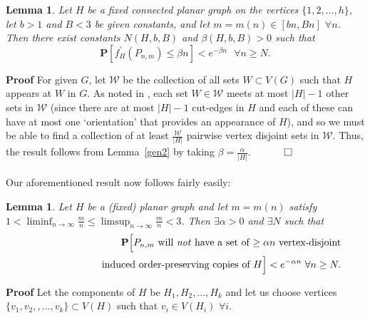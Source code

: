 \documentclass{article}
\newtheorem{Lemma}[Theorem]{Lemma}
\newtheorem{Proof of Theorem}{Proof of Theorem}
\begin{document}
\begin{Lemma} \label{gen12}
Let $H$ be a fixed connected planar graph on the vertices $\{1,2, \ldots ,h\}$,
let $b>1$ and $B<3$ be given constants,
and let $m=m(n) \in [bn,Bn]$ $\forall n$.
Then there exist constants $N(H,b,B)$ and $\beta(H,b,B) >0$ such that
\begin{displaymath}
\mathbf{P}[f_{H}^{\prime}(P_{n,m}) \leq \beta n] < e^{- \beta n} \textrm{ } \forall n \geq N.
\end{displaymath}
\end{Lemma}
\textbf{Proof}
For given $G$, let $\mathcal{W}$ be the collection of all sets $W \subset V(G)$ such that $H$ appears at $W$ in $G$.
As noted in \cite{ger}, each set $W \in \mathcal{W}$ meets at most $|H|-1$ other sets in $\mathcal{W}$
(since there are at most $|H|-1$ cut-edges in $H$
and each of these can have at most one `orientation' that provides an appearance of $H$),
and so we must be able to find a collection of at least 
$\frac{\mathcal{W}}{|H|}$ pairwise vertex disjoint sets in $\mathcal{W}$.
Thus, the result follows from Lemma~\ref{gen2} by taking $\beta = \frac{\alpha}{|H|}$.
$\phantom{qwerty}
\setlength{\unitlength}{.25cm}
\begin{picture}(1,1)
\put(0,0){\line(1,0){1}}
\put(0,0){\line(0,1){1}}
\put(1,1){\line(-1,0){1}}
\put(1,1){\line(0,-1){1}}
\end{picture}$ 
\\
\\











Our aforementioned result now follows fairly easily:














\begin{Lemma} \label{sub3}
Let $H$ be a (fixed) planar graph and let $m=m(n)$ satisfy \\
$1 < \liminf_{n \to \infty} \frac{m}{n} \leq \limsup_{n \to \infty} \frac{m}{n} < 3$.
Then $\exists \alpha > 0$ and $\exists N$ such that
\begin{eqnarray*}
& & \mathbf{P}\Big[\textrm{$P_{n,m}$
will \emph{not} have a set of $\geq \alpha n$ vertex-disjoint} \\
& & \phantom{wwwwwwwwi}\textrm{induced order-preserving copies of $H$}\Big] 
< e^{- \alpha n} 
\textrm{ } \forall n \geq N.
\end{eqnarray*}
\end{Lemma}
\textbf{Proof}
Let the components of $H$ be $H_{1}, H_{2}, \ldots, H_{k}$
and let us choose vertices
$\{ v_{1}, v_{2}, , \ldots, v_{k} \} \subset V(H)$
such that $v_{i} \in V(H_{i})$ $\forall i$.
\end{document}
